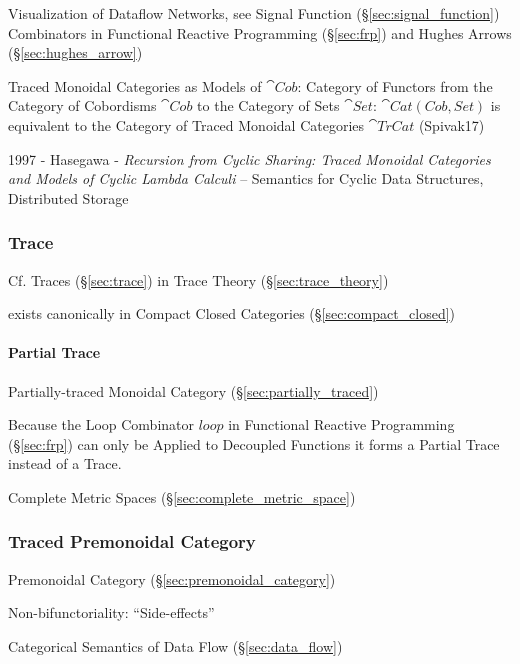 Visualization of Dataflow Networks, see Signal Function
(\S\ref{sec:signal_function}) Combinators in Functional Reactive Programming
(\S\ref{sec:frp}) and Hughes Arrows (\S\ref{sec:hughes_arrow})

Traced Monoidal Categories as Models of $\cat{Cob}$: Category of Functors from
the Category of Cobordisms $\cat{Cob}$ to the Category of Sets $\cat{Set}$:
$\cat{Cat(Cob,Set)}$ is equivalent to the Category of Traced Monoidal Categories
$\cat{TrCat}$ (Spivak17)

1997 - Hasegawa - \emph{Recursion from Cyclic Sharing: Traced Monoidal
  Categories and Models of Cyclic Lambda Calculi} -- Semantics for Cyclic Data
Structures, Distributed Storage



\subsubsection{Trace}\label{sec:category_trace}

\fist Cf. Traces (\S\ref{sec:trace}) in Trace Theory
(\S\ref{sec:trace_theory})

exists canonically in Compact Closed Categories
(\S\ref{sec:compact_closed}) %



\paragraph{Partial Trace}\label{sec:partial_trace}\hfill

Partially-traced Monoidal Category (\S\ref{sec:partially_traced})

Because the Loop Combinator $loop$ in Functional Reactive Programming
(\S\ref{sec:frp}) can only be Applied to Decoupled Functions it forms
a Partial Trace instead of a Trace.

Complete Metric Spaces (\S\ref{sec:complete_metric_space})



\subsubsection{Traced Premonoidal Category}
\label{sec:traced_premonoidal}

Premonoidal Category (\S\ref{sec:premonoidal_category})

Non-bifunctoriality: ``Side-effects'' \cite{jacobs-heunen-hasuo09}

Categorical Semantics of Data Flow (\S\ref{sec:data_flow})

